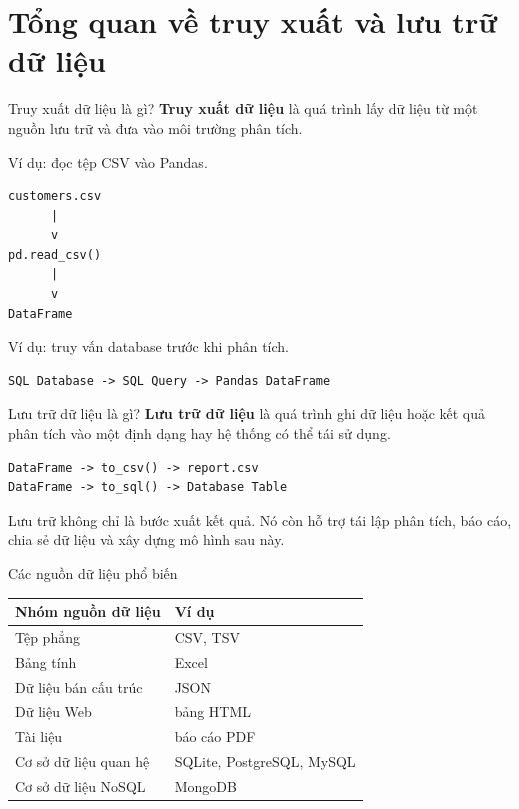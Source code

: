 \documentclass[aspectratio=169,11pt]{beamer}
\newcommand{\smallgap}{\vspace{0.4em}}
\begin{document}
\section{Tổng quan về truy xuất và lưu trữ dữ liệu}

\begin{frame}[fragile]{Truy xuất dữ liệu là gì?}
\textbf{Truy xuất dữ liệu} là quá trình lấy dữ liệu từ một nguồn lưu trữ và đưa vào môi trường phân tích.

\smallgap
Ví dụ: đọc tệp CSV vào Pandas.
\begin{lstlisting}[style=textstyle]
customers.csv
      |
      v
pd.read_csv()
      |
      v
DataFrame
\end{lstlisting}

Ví dụ: truy vấn database trước khi phân tích.
\begin{lstlisting}[style=textstyle]
SQL Database -> SQL Query -> Pandas DataFrame
\end{lstlisting}
\end{frame}

\begin{frame}[fragile]{Lưu trữ dữ liệu là gì?}
\textbf{Lưu trữ dữ liệu} là quá trình ghi dữ liệu hoặc kết quả phân tích vào một định dạng hay hệ thống có thể tái sử dụng.

\begin{lstlisting}[style=textstyle]
DataFrame -> to_csv() -> report.csv
DataFrame -> to_sql() -> Database Table
\end{lstlisting}

\smallgap
Lưu trữ không chỉ là bước xuất kết quả. Nó còn hỗ trợ tái lập phân tích, báo cáo, chia sẻ dữ liệu và xây dựng mô hình sau này.
\end{frame}

\begin{frame}{Các nguồn dữ liệu phổ biến}
\begin{tabularx}{\textwidth}{lX}
\toprule
\textbf{Nhóm nguồn dữ liệu} & \textbf{Ví dụ} \\
\midrule
Tệp phẳng & CSV, TSV \\
Bảng tính & Excel \\
Dữ liệu bán cấu trúc & JSON \\
Dữ liệu Web & bảng HTML \\
Tài liệu & báo cáo PDF \\
Cơ sở dữ liệu quan hệ & SQLite, PostgreSQL, MySQL \\
Cơ sở dữ liệu NoSQL & MongoDB \\
\bottomrule
\end{tabularx}
\end{frame}
\end{document}
